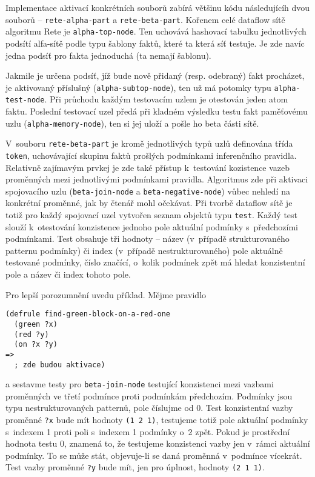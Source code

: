 Implementace aktivací konkrétních souborů zabírá většinu kódu následujícíh dvou
souborů -- \verb|rete-alpha-part| a \verb|rete-beta-part|. Kořenem celé dataflow
sítě algoritmu Rete je \verb|alpha-top-node|. Ten uchovává hashovací tabulku
jednotlivých podsítí alfa-sítě podle typu šablony faktů, které ta která síť
testuje. Je zde navíc jedna podsíť pro fakta jednoduchá (ta nemají šablonu).

Jakmile je určena podsíť, jíž bude nově přidaný (resp. odebraný) fakt procházet,
je aktivovaný příslušný  (\verb|alpha-subtop-node|), ten už má
potomky typu \verb|alpha-test-node|. Při průchodu každým testovacím uzlem je
otestován jeden atom faktu. Poslední testovací uzel předá při kladném výsledku
testu fakt paměťovému uzlu (\verb|alpha-memory-node|), ten si jej uloží
a pošle ho beta části sítě.

V~souboru \verb|rete-beta-part| je kromě jednotlivých typů uzlů definována třída
\verb|token|, uchovávající skupinu faktů prošlých podmínkami inferenčního 
pravidla. Relativně zajímavým prvkej je zde také přístup k~testování  kozistence
vazeb proměnných mezi jednotlivými podmínkami pravidla. Algoritmus zde při
aktivaci spojovacího uzlu (\verb|beta-join-node| a \verb|beta-negative-node|)
vůbec nehledí na konkrétní proměnné, jak by čtenář mohl očekávat. Při tvorbě
dataflow sítě je totiž pro každý spojovací uzel vytvořen seznam objektů typu
\verb|test|. Každý test slouží k~otestování konzistence jednoho pole aktuální
podmínky s~předchozími podmínkami. Test obsahuje tři hodnoty -- název (v~případě
strukturovaného patternu podmínky) či index (v~případě nestrukturovaného)
pole aktuálně testované podmínky, číslo značící, o~kolik podmínek zpět má hledat
konzistentní pole a název či index tohoto pole.

Pro lepší porozumnění uvedu příklad. Mějme pravidlo
\begin{verbatim}
(defrule find-green-block-on-a-red-one
  (green ?x)
  (red ?y)
  (on ?x ?y)
=>
  ; zde budou aktivace)
\end{verbatim}
a sestavme testy pro \verb|beta-join-node| testující konzistenci mezi vazbami
proměnných ve třetí podmínce proti podmínkám předchozím. Podmínky jsou typu
nestrukturovaných patternů, pole číslujme od 0. Test konzistentní vazby
proměnné \verb|?x| bude mít hodnoty \verb|(1 2 1)|, testujeme totiž pole
aktuální podmínky s~indexem 1 proti poli s~indexem 1 podmínky o~2 zpět.
Pokud je prostřední hodnota testu 0, znamená to, že testujeme konzistenci vazby
jen v~rámci aktuální podmínky. To se může stát, objevuje-li se daná proměnná
v~podmínce vícekrát. Test vazby proměnné \verb|?y| bude mít, jen pro úplnost,
hodnoty \verb|(2 1 1)|.

